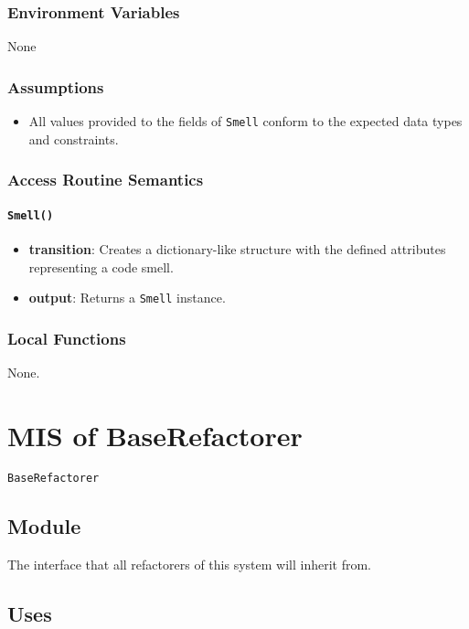 \documentclass[12pt, titlepage]{article}
\begin{document}
\subsubsection{Environment Variables}
None

\subsubsection{Assumptions}
\begin{itemize}
  \item All values provided to the fields of \texttt{Smell} conform to the expected data types and constraints.
\end{itemize}

\subsubsection{Access Routine Semantics}

\paragraph{\texttt{Smell()}}
\begin{itemize}
  \item \textbf{transition}: Creates a dictionary-like structure with the defined attributes representing a code smell.
  \item \textbf{output}: Returns a \texttt{Smell} instance.
\end{itemize}

\subsubsection{Local Functions}
None.
  

\newpage

\section{MIS of BaseRefactorer} \label{mis:baseR}

\texttt{BaseRefactorer}

\subsection{Module}

The interface that all refactorers of this system will inherit from.

\subsection{Uses}
\end{document}
